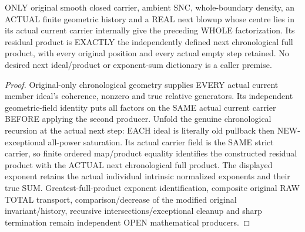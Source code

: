 \begin{theorem}
\label{hir:sharp-original-next-chronological-product-new-exceptional-factor-sum}
\leanok
ONLY original smooth closed carrier, ambient SNC, whole-boundary density,
an ACTUAL finite geometric history and a REAL next blowup whose centre
lies in its actual current carrier internally give the preceding WHOLE
factorization. Its residual product is EXACTLY the independently defined
next chronological full product, with every original position and every
actual empty step retained. No desired next ideal/product or exponent-sum
dictionary is a caller premise.
\end{theorem}
\begin{proof}
Original-only chronological geometry supplies EVERY actual current member
ideal's coherence, nonzero and true relative generators. Its independent
geometric-field identity puts all factors on the SAME actual current
carrier BEFORE applying the second producer. Unfold the genuine chronological
recursion at the actual next step: EACH ideal is literally old pullback
then NEW-exceptional all-power saturation. Its actual carrier field is the
SAME strict carrier, so finite ordered map/product equality identifies the
constructed residual product with the ACTUAL next chronological full product.
The displayed exponent retains the actual individual intrinsic normalized
exponents and their true SUM. Greatest-full-product exponent identification,
composite original RAW TOTAL transport, comparison/decrease of the modified
original invariant/history, recursive intersections/exceptional cleanup and
sharp termination remain independent OPEN mathematical producers.
\end{proof}
